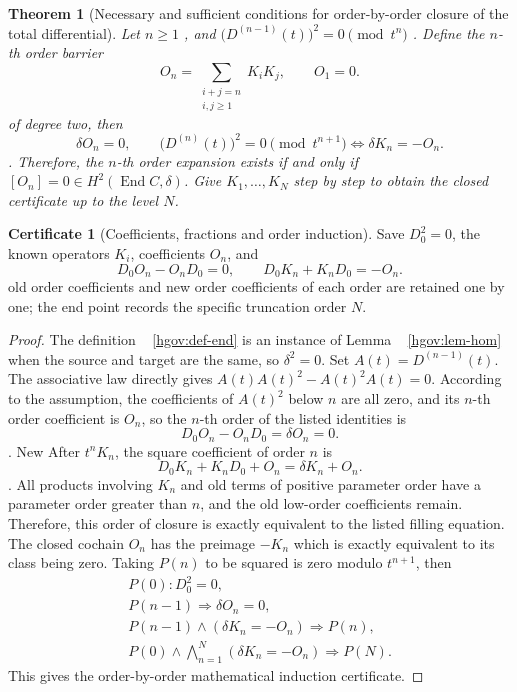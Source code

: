 \documentclass[12pt,a4paper,openany,notitlepage]{report}
\theoremstyle{plain}
\newtheorem{theorem}{Theorem}[chapter]
\theoremstyle{definition}
\newtheorem*{certificate}{Certificate}
\theoremstyle{remark}
\begin{document}
\begin{CJK*}
\begin{theorem}
[Necessary and sufficient conditions for order-by-order closure of the total differential]\label{hgov:thm-total-tower}
Let $n\ge1$ , and $\bigl(D^{(n-1)}(t)\bigr)^2=0\pmod{t^n}$ . Define the $n$-th order barrier \[
 O_n=\sum_{\substack{i+j=n\\i,j\ge1}}K_iK_j,
 \qquad O_1=0.
\] of degree two, then \[
 \delta O_n=0,
 \qquad
 \bigl(D^{(n)}(t)\bigr)^2=0\pmod{t^{n+1}}
 \Longleftrightarrow
 \delta K_n=-O_n.
\]. Therefore, the $n$-th order expansion exists if and only if $[O_n]=0\in H^2(\operatorname{End}C,\delta)$. Give $K_1,\ldots,K_N$ step by step to obtain the closed certificate up to the level $N$.\end{theorem}
\begin{certificate}
[Coefficients, fractions and order induction]Save $D_0^2=0$, the known operators $K_i$, coefficients $O_n$, and \[
 D_0O_n-O_nD_0=0,\qquad
 D_0K_n+K_nD_0=-O_n.
\] old order coefficients and new order coefficients of each order are retained one by one; the end point records the specific truncation order $N$.\end{certificate}
\begin{proof}
The definition ~ \ref{hgov:def-end} is an instance of Lemma ~ \ref{hgov:lem-hom} when the source and target are the same, so $\delta^2=0$. Set $A(t)=D^{(n-1)}(t)$. The associative law directly gives $A(t)A(t)^2-A(t)^2A(t)=0$. According to the assumption, the coefficients of $A(t)^2$ below $n$ are all zero, and its $n$-th order coefficient is $O_n$, so the $n$-th order of the listed identities is \[
 D_0O_n-O_nD_0=\delta O_n=0.
\]. New After $t^nK_n$, the square coefficient of order $n$ is \[
 D_0K_n+K_nD_0+O_n=\delta K_n+O_n.
\]. All products involving $K_n$ and old terms of positive parameter order have a parameter order greater than $n$, and the old low-order coefficients remain. Therefore, this order of closure is exactly equivalent to the listed filling equation. The closed cochain $O_n$ has the preimage $-K_n$ which is exactly equivalent to its class being zero. Taking $P(n)$ to be squared is zero modulo $t^{n+1}$, then \[
 \begin{gathered}
 P(0):D_0^2=0,\\
 P(n-1)\Longrightarrow\delta O_n=0,\\
 P(n-1)\wedge(\delta K_n=-O_n)
 \Longrightarrow P(n),\\
 P(0)\wedge
 \bigwedge_{n=1}^{N}(\delta K_n=-O_n)
 \Longrightarrow P(N).
 \end{gathered}
\] This gives the order-by-order mathematical induction certificate.\end{proof}



\end{CJK*}
\end{document}
